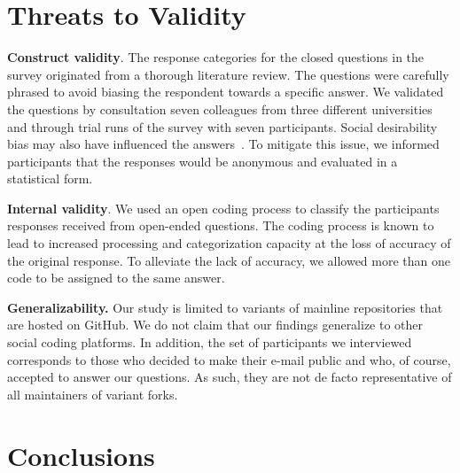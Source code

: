 \section{Threats to Validity}

\noindent \textbf{Construct validity}.
The response categories for the closed questions in the survey originated from a thorough literature review.
The questions were carefully phrased to avoid biasing the respondent towards a specific answer. We validated the questions by consultation seven colleagues from three different universities and through trial runs of the survey with seven participants.
Social desirability bias may also have influenced the answers~\cite{Furnham:1986}. To mitigate this issue, we informed participants that the responses would be anonymous and evaluated in a statistical form.

\noindent \textbf{Internal validity}. We used an open coding process to classify the participants responses received from open-ended questions. The coding process is known to lead to increased processing and categorization capacity at the loss of accuracy of the original response. To alleviate the lack of accuracy, we allowed more than one code to be assigned to the same answer.

\noindent \textbf{Generalizability.} Our study is limited to variants of mainline repositories that are hosted on GitHub. We do not claim that our findings generalize to other social coding platforms.
In addition, the set of participants we interviewed corresponds to those who decided to make their e-mail public and who, of course, accepted to answer our questions. As such, they are not de facto representative of all maintainers of variant forks.

\section{Conclusions}


